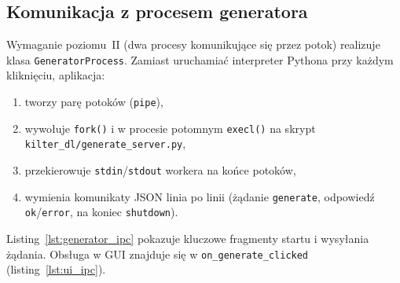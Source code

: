 \documentclass[fleqn,onecolumn,a4paper,12pt,titlepage]{article}
\begin{document}
\subsection*{Komunikacja z procesem generatora}

Wymaganie poziomu~II (dwa procesy komunikujące się przez potok) realizuje klasa
\texttt{GeneratorProcess}. Zamiast uruchamiać interpreter Pythona przy każdym kliknięciu,
aplikacja:
\begin{enumerate}[leftmargin=1.5em]
    \item tworzy parę potoków (\texttt{pipe}),
    \item wywołuje \texttt{fork()} i w procesie potomnym \texttt{execl()} na skrypt
          \texttt{kilter\_dl/generate\_server.py},
    \item przekierowuje \texttt{stdin}/\texttt{stdout} workera na końce potoków,
    \item wymienia komunikaty JSON linia po linii (żądanie \texttt{generate},
          odpowiedź \texttt{ok}/\texttt{error}, na koniec \texttt{shutdown}).
\end{enumerate}

Listing~\ref{lst:generator_ipc} pokazuje kluczowe fragmenty startu i wysyłania żądania.
Obsługa w GUI znajduje się w \texttt{on\_generate\_clicked} (listing~\ref{lst:ui_ipc}).






\end{document}
